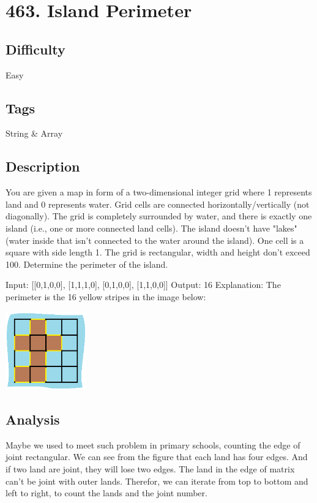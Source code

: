 \tocless\section{463. Island Perimeter}
\label{algo:463}

\subsection*{Difficulty}
Easy

\subsection*{Tags}
String \& Array

\subsection*{Description}
You are given a map in form of a two-dimensional integer grid where 1 represents land and 0 represents water. Grid cells are connected horizontally/vertically (not diagonally). The grid is completely surrounded by water, and there is exactly one island (i.e., one or more connected land cells). The island doesn't have "lakes" (water inside that isn't connected to the water around the island). One cell is a square with side length 1. The grid is rectangular, width and height don't exceed 100. Determine the perimeter of the island.

\begin{example}
\begin{multilinecode}
Input:
[[0,1,0,0],
[1,1,1,0],
[0,1,0,0],
[1,1,0,0]]
Output: 16
Explanation:
The perimeter is the 16 yellow stripes in the image below:
\end{multilinecode}
\includegraphics*[width=3.5cm]{figs/algo_463_1}
\end{example}

\subsection*{Analysis}
Maybe we used to meet such problem in primary schools, counting the edge of joint rectangular. We can see from the figure that each land has four edges. And if two land are joint, they will lose two edges. The land in the edge of matrix can't be joint with outer lands. Therefor, we can iterate from top to bottom and left to right, to count the lands and the joint number.

